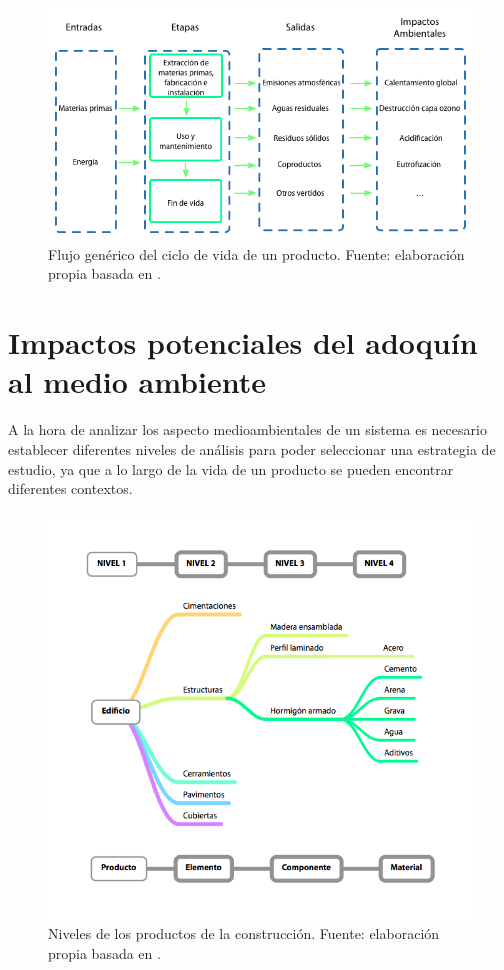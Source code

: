 \begin{figure}[!htb]
\centering
\includegraphics[width=15cm]{img/flujo_generico_acv.png}
\caption[Flujo genérico del ciclo de vida de un producto.]{Flujo genérico del ciclo de vida de un producto. Fuente: elaboración propia basada en \cite{pfullana}.}
\label{fig:flujo_generico_acv}
\end{figure}

\section{Impactos potenciales del adoquín al medio ambiente}
A la hora de analizar los aspecto medioambientales de un sistema es necesario establecer diferentes niveles de análisis para poder seleccionar una estrategia de estudio, ya que a lo largo de la vida de un producto se pueden encontrar diferentes contextos.

\begin{figure}[!htb]
\centering
\includegraphics[width=15cm]{img/niveles_productos_construccion.png}
\caption[Niveles de los productos de la construcción.]{Niveles de los productos de la construcción. Fuente: elaboración propia basada en \protect\cite{carvalho}.}
\label{fig:niveles_productos_construccion}
\end{figure}

